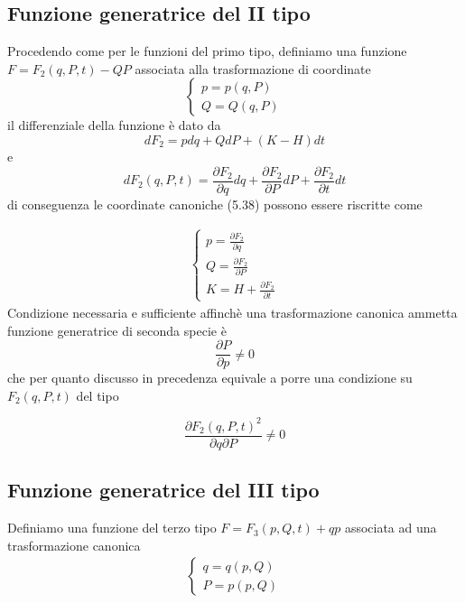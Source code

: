 \subsection{Funzione generatrice del II tipo}

Procedendo come per le funzioni del primo tipo, definiamo una funzione $F = F_2(q,P,t) - QP $ associata alla trasformazione di coordinate 
\begin{equation}
\begin{cases}
	p = p(q,P)\\
	Q = Q(q,P)
\end{cases}
\end{equation}
il differenziale della funzione \`{e} dato da 
\begin{equation}
	dF_2 = pdq +QdP + (K-H)dt
\end{equation}
e 
\begin{equation}
	{dF_2(q,P,t)}= \frac{\partial F_2}{\partial q}dq +\frac{\partial F_2}{\partial P}dP + \frac{\partial F_2}{\partial t}dt
\end{equation}
di conseguenza le coordinate canoniche (5.38) possono essere riscritte come

\begin{align}
	\begin{cases}
		p = \frac{\partial F_2}{\partial q} \\
		Q = \frac{\partial F_2}{\partial P} \\
		K = H + \frac{\partial F_2}{\partial t}
	\end{cases}
\end{align}
Condizione necessaria e sufficiente affinch\`{e} una trasformazione canonica ammetta funzione generatrice di seconda specie \`{e}
\begin{equation}
	\frac{\partial P}{\partial p} \neq 0
\end{equation}
che per quanto discusso in precedenza equivale a porre una condizione su $F_2(q,P,t)$ del tipo

\begin{equation}
	\frac{\partial F_2(q,P,t)^2}{\partial q \partial P} \neq 0
\end{equation}

\subsection{Funzione generatrice del III tipo}

Definiamo una funzione del terzo tipo $F = F_3(p,Q,t) + qp$ associata ad una trasformazione canonica 
\begin{align}
	\begin{cases}
		q = q(p,Q)\\
		P = p(p,Q)
	\end{cases}
\end{align}

